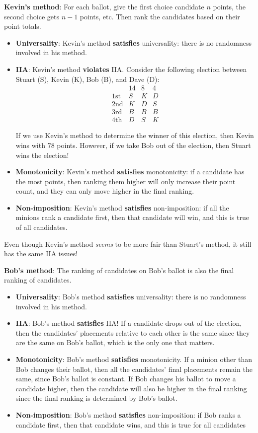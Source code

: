 \documentclass{article}
\begin{document}
\textbf{Kevin’s method}: For each ballot, give the first choice candidate $n$ points, the second choice gets $n-1$ points, etc. Then rank the candidates based on their point totals. 
\begin{itemize}
	\item \textbf{Universality}: Kevin’s method \textbf{satisfies} universality: there is no randomness involved in his method.
	\item \textbf{IIA}: Kevin’s method {\textbf{violates}} IIA. Consider the following election between Stuart (S), Kevin (K), Bob (B), and Dave (D):
	\[
		\begin{array}{c|ccc}
				& 14 & 8 & 4 \\
			\text{1st} & S & K & D \\
			\text{2nd} & K & D & S \\
			\text{3rd} & B & B & B \\
			\text{4th} & D & S & K
		\end{array}
	\]

	If we use Kevin’s method to determine the winner of this election, then Kevin wins with $78$ points. However, if we take Bob out of the election, then Stuart wins the election! 
	\item \textbf{Monotonicity}: Kevin’s method {\textbf{satisfies}} monotonicity: if a candidate has the most points, then ranking them higher will only increase their point count, and they can only move higher in the final ranking.
	\item \textbf{Non-imposition}: Kevin’s method {\textbf{satisfies}} non-imposition: if all the minions rank a candidate first, then that candidate will win, and this is true of all candidates. 
\end{itemize}
Even though Kevin’s method \textit{seems} to be more fair than Stuart's method, it still has the same IIA issues! 

\textbf{Bob’s method}: The ranking of candidates on Bob’s ballot is also the final ranking of candidates. 
\begin{itemize}
	\item \textbf{Universality}: Bob’s method {\textbf{satisfies}} universality: there is no randomness involved in his method.
	\item \textbf{IIA}: Bob’s method {\textbf{satisfies}} IIA! If a candidate drops out of the election, then the candidates’ placements relative to each other is the same since they are the same on Bob’s ballot, which is the only one that matters.
	\item \textbf{Monotonicity}: Bob’s method {\textbf{satisfies}} monotonicity. If a minion other than Bob changes their ballot, then all the candidates’ final placements remain the same, since Bob’s ballot is constant. If Bob changes his ballot to move a candidate higher, then the candidate will also be higher in the final ranking since the final ranking is determined by Bob’s ballot. 
	\item \textbf{Non-imposition}: Bob’s method {\textbf{satisfies}} non-imposition: if Bob ranks a candidate first, then that candidate wins, and this is true for all candidates
\end{itemize}
\end{document}
